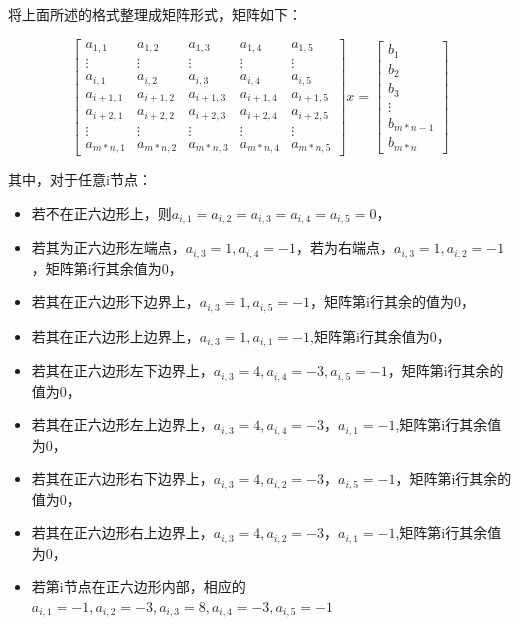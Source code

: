 \documentclass[a4paper,11pt]{ctexart} %
\begin{document}
将上面所述的格式整理成矩阵形式，矩阵如下：\par

\[
\left[\begin{array}{cccccc}
  a_{1,1} &a_{1,2} &a_{1,3} &a_{1,4} &a_{1,5}\\
   \vdots &\vdots &\vdots &\vdots &\vdots  \\
  a_{i,1} &a_{i,2} &a_{i,3} &a_{i,4} &a_{i,5}\\
  a_{i+1,1} &a_{i+1,2} &a_{i+1,3} &a_{i+1,4} &a_{i+1,5}\\
  a_{i+2,1} &a_{i+2,2} &a_{i+2,3} &a_{i+2,4} &a_{i+2,5}\\
   \vdots &\vdots &\vdots &\vdots &\vdots  \\
  a_{m*n,1} &a_{m*n,2} &a_{m*n,3} &a_{m*n,4} &a_{m*n,5}
\end{array}\right]x=\left[\begin{array}{c}
  b_1\\
  b_2\\
  b_3\\
  \vdots\\
  b_{m*n-1}\\
  b_{m*n}
\end{array}\right]\]

其中，对于任意i节点：\par
\begin{itemize}
\item 若不在正六边形上，则$a_{i,1}=a_{i,2}=a_{i,3}=a_{i,4}=a_{i,5}=0$，
\item 若其为正六边形左端点，$a_{i,3}=1,a_{i,4}=-1$，若为右端点，$a_{i,3}=1,a_{i,2}=-1$，矩阵第i行其余值为0，
\item 若其在正六边形下边界上，$a_{i,3}=1,a_{i,5}=-1$，矩阵第i行其余的值为0，
\item 若其在正六边形上边界上，$a_{i,3}=1,a_{i,1}=-1$,矩阵第i行其余值为0，
\item 若其在正六边形左下边界上，$a_{i,3}=4,a_{i,4}=-3,a_{i,5}=-1$，矩阵第i行其余的值为0，
\item 若其在正六边形左上边界上，$a_{i,3}=4,a_{i,4}=-3，a_{i,1}=-1$,矩阵第i行其余值为0，
\item 若其在正六边形右下边界上，$a_{i,3}=4,a_{i,2}=-3，a_{i,5}=-1$，矩阵第i行其余的值为0，
\item 若其在正六边形右上边界上，$a_{i,3}=4,a_{i,2}=-3，a_{i,1}=-1$,矩阵第i行其余值为0，
\item 若第i节点在正六边形内部，相应的$a_{i,1}=-1,a_{i,2}=-3,a_{i,3}=8,a_{i,4}=-3,a_{i,5}=-1$
\end{itemize}
\end{document}

